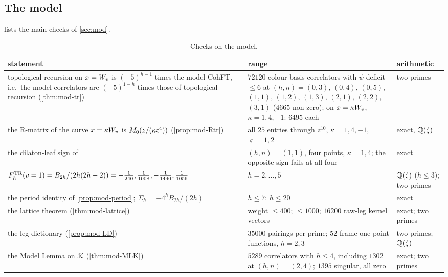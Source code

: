 
\subsection{The model}
\label{sec:evi-model}

 lists the main checks of \cref{sec:mod}.

\begin{table}[ht]
\centering\small
\begin{tabular}{>{\raggedright\arraybackslash}p{}|>{\raggedright\arraybackslash}p{}|>{\raggedright\arraybackslash}p{}}
statement & range & arithmetic\\ \hline
topological recursion on $x=W_{v}$ is $(-5)^{h-1}$ times the model CohFT, i.e.\ the model correlators are $(-5)^{1-h}$ times those of topological recursion (\cref{thm:mod-tr}) & $72120$ colour-basis correlators with $\psi$-deficit $\leq 6$ at $(h,n)=(0,3)$, $(0,4)$, $(0,5)$, $(1,1)$, $(1,2)$, $(1,3)$, $(2,1)$, $(2,2)$, $(3,1)$ ($4665$ non-zero); on $x=\kappa W_{v}$, $\kappa=1,4,-1$: $6495$ each & two primes\\
the R-matrix of the curve $x=\kappa W_{v}$ is $M_{0}(z/(\kappa\varsigma^4))$ (\cref{prop:mod-Rtr}) & all $25$ entries through $z^{10}$, $\kappa=1,4,-1$, $\varsigma=1,2$ & exact, $\mathbb{Q}(\zeta)$\\
the dilaton-leaf sign of \cite[Def.~2.13]{PPZ15} & $(h,n)=(1,1)$, four points, $\kappa=1,4$; the opposite sign fails at all four & exact\\
$F^{\mathrm{TR}}_h(v=1)=B_{2h}/(2h(2h-2))=-\tfrac{1}{240},\tfrac{1}{1008},-\tfrac{1}{1440},\tfrac{1}{1056}$ & $h=2,\dots,5$ & $\mathbb{Q}(\zeta)$ ($h\leq 3$); two primes\\
the period identity of \cref{prop:mod-period}; $\Sigma_h=-4^hB_{2h}/(2h)$ & $h\leq 7$; $h\leq 20$ & exact\\
the lattice theorem (\cref{thm:mod-lattice}) & weight $\leq 400$; $\leq 1000$; $16200$ raw-leg kernel vectors & exact; two primes\\
the leg dictionary (\cref{prop:mod-LD}) & $35000$ pairings per prime; $52$ frame one-point functions, $h=2,3$ & two primes; $\mathbb{Q}(\zeta)$\\
the Model Lemma on $\mathcal{K}$ (\cref{thm:mod-MLK}) & $5289$ correlators with $h\leq 4$, including $1302$ at $(h,n)=(2,4)$; $1395$ singular, all zero & exact; two primes\\
\end{tabular}
\caption{Checks on the model.}
\label{tab:evi-model}
\end{table}

